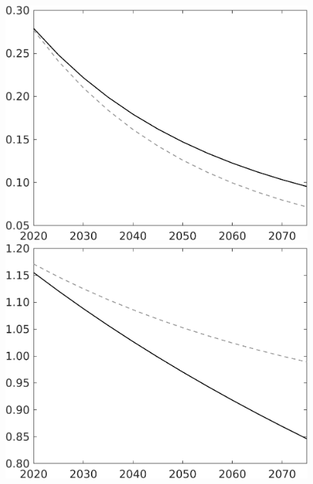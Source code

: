 \documentclass[12pt]{article}
\begin{document}
\begin{figure}[h!!]
\begin{minipage}[]{0.32\textwidth}
	\end{minipage}		
	\begin{minipage}[]{0.32\textwidth}
		\includegraphics[width=1\textwidth]{../../codding_model/own_basedOnFried/optimalPol_010922_revision/figures/all_13Sept22/LevTaufNoTauf_TaulCalib_regime0_pf_spillover0_nsk1_xgr0_knspil1_sep1_LFlimit0_emsbase0_countec0_GovRev0_etaa0.79_lgd0.png}
	\end{minipage}
	\begin{minipage}[]{0.32\textwidth}
		\includegraphics[width=1\textwidth]{../../codding_model/own_basedOnFried/optimalPol_010922_revision/figures/all_13Sept22/LevTaufNoTauf_TaulCalib_regime0_pg_spillover0_nsk1_xgr0_knspil1_sep1_LFlimit0_emsbase0_countec0_GovRev0_etaa0.79_lgd0.png}

\end{minipage}
\end{figure}
\end{document}
